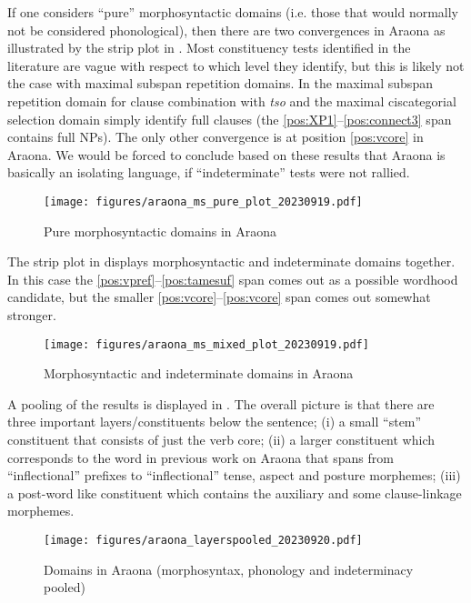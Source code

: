 \documentclass[output=paper,hidelinks]{langscibook}
\begin{document}
If one considers ``pure'' morphosyntactic domains (i.e. those that would normally not be considered phonological), then there are two convergences in Araona as illustrated by the strip plot in . Most constituency tests identified in the literature are vague with respect to which level they identify, but this is likely not the case with maximal subspan repetition domains. In the maximal subspan repetition domain for clause combination with \textit{tso} and the maximal ciscategorial selection domain simply identify full clauses (the \ref{pos:XP1}--\ref{pos:connect3} span contains full NPs). The only other convergence is at position \ref{pos:vcore} in Araona. We would be forced to conclude based on these results that Araona is basically an isolating language, if ``indeterminate'' tests were not rallied.

\begin{figure}
    \texttt{[image: figures/araona\_ms\_pure\_plot\_20230919.pdf]}
    \caption{Pure morphosyntactic domains in Araona}
    \label{fig:morphosyntacticpuredomains}
\end{figure}

The strip plot in  displays morphosyntactic and indeterminate domains together. In this case the \ref{pos:vpref}--\ref{pos:tamesuf} span comes out as a possible wordhood candidate, but the smaller \ref{pos:vcore}--\ref{pos:vcore} span comes out somewhat stronger.

\begin{figure}
    \texttt{[image: figures/araona\_ms\_mixed\_plot\_20230919.pdf]}
    \caption{Morphosyntactic and indeterminate domains in Araona}
    \label{fig:morphosyntacticindeterminatedomains2}
\end{figure}

A pooling of the results is displayed in . The overall picture is that there are three important layers/constituents below the sentence;
(i) a small ``stem'' constituent that consists of just the verb core;
(ii) a larger constituent which corresponds to the word in previous work on Araona that spans from ``inflectional'' prefixes to ``inflectional'' tense, aspect and posture morphemes;
(iii) a post-word like constituent which contains the auxiliary and some clause-linkage morphemes.

\begin{figure}
    \texttt{[image: figures/araona\_layerspooled\_20230920.pdf]}
    \caption{Domains in Araona (morphosyntax, phonology and indeterminacy pooled)}
    \label{fig:domainspooled}
\end{figure}
\end{document}
